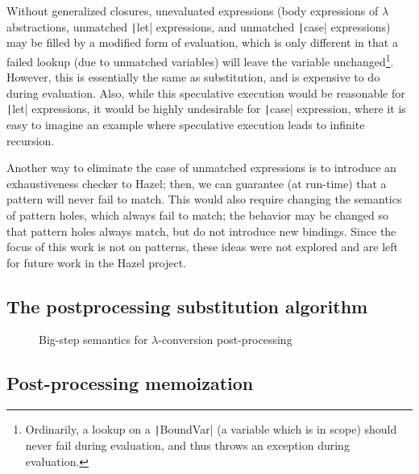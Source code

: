 Without generalized closures, unevaluated expressions (body expressions of $\lambda$ abstractions, unmatched \texttt|let| expressions, and unmatched \texttt|case| expressions) may be filled by a modified form of evaluation, which is only different in that a failed lookup (due to unmatched variables) will leave the variable unchanged\footnote{Ordinarily, a lookup on a \texttt|BoundVar| (a variable which is in scope) should never fail during evaluation, and thus throws an exception during evaluation.}. However, this is essentially the same as substitution, and is expensive to do during evaluation. Also, while this speculative execution would be reasonable for \texttt|let| expressions, it would be highly undesirable for \texttt|case| expression, where it is easy to imagine an example where speculative execution leads to infinite recursion.

Another way to eliminate the case of unmatched expressions is to introduce an exhaustiveness checker to Hazel; then, we can guarantee (at run-time) that a pattern will never fail to match. This would also require changing the semantics of pattern holes, which always fail to match; the behavior may be changed so that pattern holes always match, but do not introduce new bindings. Since the focus of this work is not on patterns, these ideas were not explored and are left for future work in the Hazel project.

\subsection{The postprocessing substitution algorithm}
\label{sec:postprocessing-substitution}




\begin{figure}
  \centering
  \begin{mdframed}
    \begin{singlespace}
      
    \end{singlespace}
  \end{mdframed}
  \caption{Big-step semantics for $\lambda$-conversion post-processing}
  \label{fig:big-step-inside-formal}
\end{figure}

\subsection{Post-processing memoization}
\label{sec:memoization}

